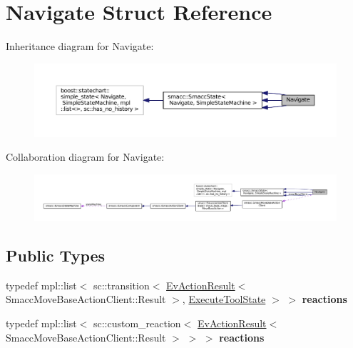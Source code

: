 \hypertarget{structNavigate}{}\section{Navigate Struct Reference}
\label{structNavigate}


Inheritance diagram for Navigate\+:
\nopagebreak
\begin{figure}[H]
\begin{center}
\leavevmode
\includegraphics[width=350pt]{structNavigate__inherit__graph}
\end{center}
\end{figure}


Collaboration diagram for Navigate\+:
\nopagebreak
\begin{figure}[H]
\begin{center}
\leavevmode
\includegraphics[width=350pt]{structNavigate__coll__graph}
\end{center}
\end{figure}
\subsection*{Public Types}
\begin{DoxyCompactItemize}
\item 
typedef mpl\+::list$<$ sc\+::transition$<$ \hyperlink{structsmacc_1_1EvActionResult}{Ev\+Action\+Result}$<$ Smacc\+Move\+Base\+Action\+Client\+::\+Result $>$, \hyperlink{structExecuteToolState}{Execute\+Tool\+State} $>$ $>$ {\bfseries reactions}\hypertarget{structNavigate_afdad91862c4900a993cc6e44309e807a}{}\label{structNavigate_afdad91862c4900a993cc6e44309e807a}

\item 
typedef mpl\+::list$<$ sc\+::custom\+\_\+reaction$<$ \hyperlink{structsmacc_1_1EvActionResult}{Ev\+Action\+Result}$<$ Smacc\+Move\+Base\+Action\+Client\+::\+Result $>$ $>$ $>$ {\bfseries reactions}\hypertarget{structNavigate_a7948e7393b5358874dede3754b993e73}{}\label{structNavigate_a7948e7393b5358874dede3754b993e73}

\end{DoxyCompactItemize}
